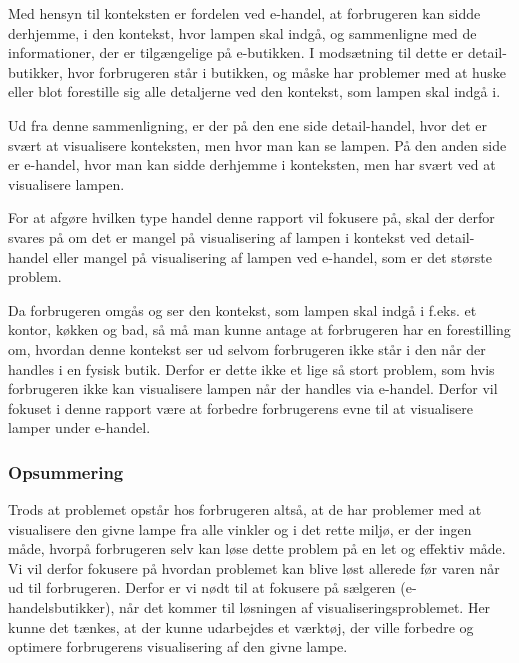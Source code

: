 Med hensyn til konteksten er fordelen ved e-handel, at forbrugeren kan sidde derhjemme, i den kontekst, hvor lampen skal indgå, og sammenligne med de informationer, der er tilgængelige på e-butikken. I modsætning til dette er detail-butikker, hvor forbrugeren står i butikken, og måske har problemer med at huske eller blot forestille sig alle detaljerne ved den kontekst, som lampen skal indgå i.

Ud fra denne sammenligning, er der på den ene side detail-handel, hvor det er svært at visualisere konteksten, men hvor man kan se lampen. På den anden side er e-handel, hvor man kan sidde derhjemme i konteksten, men har svært ved at visualisere lampen. 

For at afgøre hvilken type handel denne rapport vil fokusere på, skal der derfor svares på om det er mangel på visualisering af lampen i kontekst ved detail-handel eller mangel på visualisering af lampen ved e-handel, som er det største problem.

Da forbrugeren omgås og ser den kontekst, som lampen skal indgå i f.eks. et kontor, køkken og bad, så må man kunne antage at forbrugeren har en forestilling om, hvordan denne kontekst ser ud selvom forbrugeren ikke står i den når der handles i en fysisk butik. Derfor er dette ikke et lige så stort problem, som hvis forbrugeren ikke kan visualisere lampen når der handles via e-handel. Derfor vil fokuset i denne rapport være at forbedre forbrugerens evne til at visualisere lamper under e-handel.

\subsubsection*{Opsummering}
Trods at problemet opstår hos forbrugeren altså, at de har problemer med at visualisere den givne lampe fra alle vinkler og i det rette miljø, er der ingen måde, hvorpå forbrugeren selv kan løse dette problem på en let og effektiv måde. Vi vil derfor fokusere på hvordan problemet kan blive løst allerede før varen når ud til forbrugeren. Derfor er vi nødt til at fokusere på sælgeren (e-handelsbutikker), når det kommer til løsningen af visualiseringsproblemet. Her kunne det tænkes, at der kunne udarbejdes et værktøj, der ville forbedre og optimere forbrugerens visualisering af den givne lampe.
